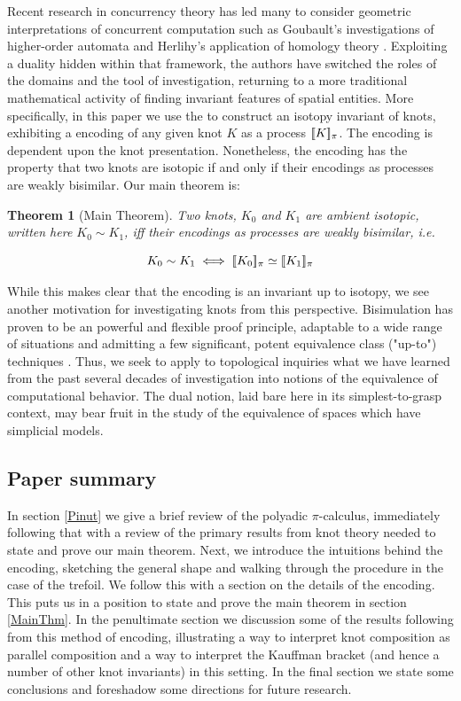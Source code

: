 \documentclass[]{llncs}
\newtheorem{thm}{Theorem}
\begin{document}
Recent research in concurrency theory has led many to consider
geometric interpretations of concurrent computation such as Goubault's
investigations of higher-order automata
\cite{DBLP:conf/concur/GoubaultJ92}
\cite{DBLP:journals/mscs/Goubault00a} and Herlihy's application of
homology theory \cite{DBLP:journals/entcs/HerlihyRT02}. Exploiting a duality hidden within that framework,
the authors have switched the roles of the domains
and the
tool of investigation,  returning to a
more traditional mathematical activity of
finding invariant features of spatial entities. 
More specifically, in this paper we use the\pic
 to construct an isotopy invariant of knots,
exhibiting a  \pic encoding of any
given knot $K$
as a process $[\![ K ]\!]_{\pi}$. The encoding is dependent upon the
knot presentation. Nonetheless, the encoding has
the property that two knots are isotopic
if and only if their encodings as processes are weakly
bisimilar.  Our main theorem is: 
\begin{thm}[Main Theorem]
  Two knots, $K_0$ and $K_1$ are ambient isotopic, written here $K_0
  \sim K_1$, iff their encodings as processes are weakly bisimilar,
  i.e.
  
  \[ %
    K_0 \sim K_1 \iff \meaningof{K_0}_{\pi}
\simeq \meaningof{K_1}_{\pi}
  \]
\end{thm}

While this makes clear that the
encoding is an invariant up to isotopy,
 we see another motivation for investigating knots from
this perspective. Bisimulation has proven to be an
powerful and flexible proof principle, adaptable to a wide
range of situations and admitting a few
significant,
potent equivalence class ("up-to") techniques
\cite{DBLP:conf/lics/Sangiorgi04}
\cite{DBLP:conf/mfcs/Sangiorgi95}. 
Thus, we
seek to apply  to
topological inquiries what we have learned
from the past
several decades of investigation into notions of
the equivalence of computational behavior.
The dual notion, laid bare here in its
simplest-to-grasp context,
may bear
fruit in the study of the equivalence of spaces
which have simplicial models.

\subsection{Paper summary}

In section \ref{Pinut} we give a brief review of the polyadic $\pi$-calculus,
immediately following that with a review of the primary results from
knot theory needed to state and prove our main theorem. Next, we
introduce the intuitions behind the encoding, sketching the general
shape and walking through the procedure in the case of the trefoil. We
follow this with a section on the details of the
encoding. This puts us in a
position to state and prove the main theorem in section
\ref{MainThm}. In the penultimate section we discussion some of the results
following from this method of encoding, illustrating a way to
interpret knot composition as parallel composition and a way to
interpret the Kauffman bracket (and hence a number of other knot
invariants) in this setting. In the final section
we state some conclusions and
foreshadow some directions for future research.
\end{document}
